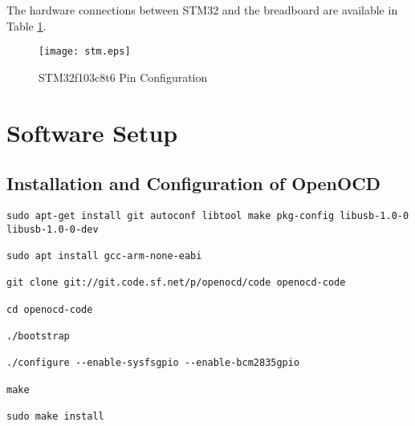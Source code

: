 \documentclass[journal,12pt,twocolumn]{IEEEtran}
\begin{document}
\begin{table}[!h]
\centering
{}
\caption{Raspberry Pi and STM32 Connections}
\label{raspstm}
\end{table}
The hardware connections between STM32 and the breadboard are available in Table \ref{stm32}.
\begin{table}[htbp]
\centering
{}
\caption{STM32 and LED connection}
\label{stm32}
\end{table}

\begin{figure}[thpb]
\centering
\texttt{[image: stm.eps]}
\caption{STM32f103c8t6 Pin Configuration}
\label{stm32}
\end{figure}

\section{Software Setup}
\subsection{Installation and Configuration of OpenOCD}
\begin{lstlisting}[frame=single, breaklines]
sudo apt-get install git autoconf libtool make pkg-config libusb-1.0-0 libusb-1.0-0-dev

sudo apt install gcc-arm-none-eabi

git clone git://git.code.sf.net/p/openocd/code openocd-code

cd openocd-code

./bootstrap

./configure --enable-sysfsgpio --enable-bcm2835gpio

make

sudo make install
\end{lstlisting}
\end{document}
